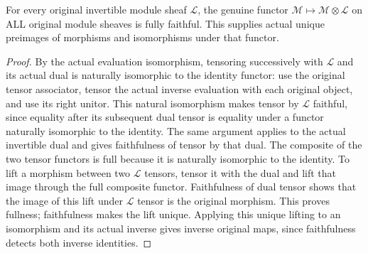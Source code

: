 \begin{lemma}
\label{lem:cartier-actual-line-tensor-fully-faithful}
\leanok
For every original invertible module sheaf $\mathcal L$, the genuine
functor $\mathcal M\mapsto\mathcal M\otimes\mathcal L$ on ALL original
module sheaves is fully faithful. This supplies actual unique
preimages of morphisms and isomorphisms under that functor.
\end{lemma}
\begin{proof}
By the actual evaluation isomorphism, tensoring successively with
$\mathcal L$ and its actual dual is naturally isomorphic to the
identity functor: use the original tensor associator, tensor the
actual inverse evaluation with each original object, and use its
right unitor. This natural isomorphism makes tensor by
$\mathcal L$ faithful, since equality after its subsequent dual tensor
is equality under a functor naturally isomorphic to the identity.
The same argument applies to the actual invertible dual and gives
faithfulness of tensor by that dual. The composite of the two tensor
functors is full because it is naturally isomorphic to the identity.
To lift a morphism between two $\mathcal L$ tensors, tensor it with
the dual and lift that image through the full composite functor.
Faithfulness of dual tensor shows that the image of this lift under
$\mathcal L$ tensor is the original morphism. This proves fullness;
faithfulness makes the lift unique. Applying this unique lifting to
an isomorphism and its actual inverse gives inverse original maps,
since faithfulness detects both inverse identities.
\end{proof}
